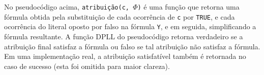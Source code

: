  No pseudocódigo acima, \texttt{atribuição(c, $\Phi$)} é uma função que retorna uma fórmula obtida pela substituição de cada ocorrência
 de \texttt{c} por \texttt{TRUE}, e cada ocorrência do literal oposto por falso na fórmula \texttt{Y}, e em seguida, simplificando a fórmula resultante.
 A função DPLL do pseudocódigo retorna verdadeiro se a atribuição final satisfaz a fórmula ou falso se tal atribuição não satisfaz 
 a fórmula. Em uma implementação real, a atribuição satisfatível também é retornada no caso de sucesso (esta foi omitida para maior clareza).